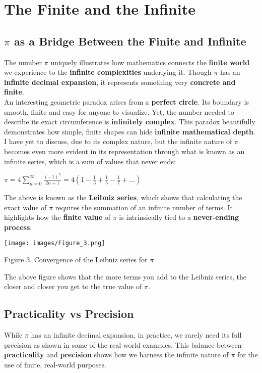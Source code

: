 \documentclass[12pt]{article}
\begin{document}
\section{The Finite and the Infinite}

\subsection{$\pi$ as a Bridge Between the Finite and Infinite}

\noindent The number $\pi$ uniquely illustrates how mathematics connects the \textbf{finite world} we experience to the \textbf{infinite complexities} underlying it. Though $\pi$ has an \textbf{infinite decimal expansion}, it represents something very \textbf{concrete and finite}. \\

\noindent An interesting geometric paradox arises from a \textbf{perfect circle}. Its boundary is smooth, finite and easy for anyone to visualize. Yet, the number needed to describe its exact circumference is \textbf{infinitely complex}. This paradox beautifully demonstrates how simple, finite shapes can hide \textbf{infinite mathematical depth}. \\

\noindent I have yet to discuss, due to its complex nature, but the infinite nature of $\pi$ becomes even more evident in its representation through what is known as an infinite series, which is a sum of values that never ends:
\begin{center}
    $\pi = 4 \sum\limits_{n=0}^\infty \frac{(-1)^n}{2n + 1} = 4\left(1 - \frac{1}{3} + \frac{1}{5} - \frac{1}{7} + \ldots\right)$ \quad [7]
\end{center}
The above is known as the \textbf{Leibniz series}, which shows that calculating the exact value of $\pi$ requires the summation of an infinite number of terms. It highlights how the \textbf{finite value} of $\pi$ is intrinsically tied to a \textbf{never-ending process}.

\begin{center}
    \texttt{[image: images/Figure\_3.png]}
    \caption{Figure 3. Convergence of the Leibniz series for $\pi$}
\end{center}


\noindent The above figure shows that the more terms you add to the Leibniz series, the closer and closer you get to the true value of $\pi$.

\subsection{Practicality vs Precision}
While $\pi$ has an infinite decimal expansion, in practice, we rarely need its full precision as shown in some of the real-world examples. This balance between \textbf{practicality} and \textbf{precision} shows how we harness the infinite nature of $\pi$ for the use of finite, real-world purposes.\\
\end{document}
